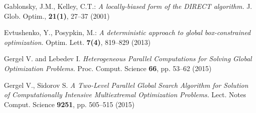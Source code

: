 \documentclass[runningheads]{llncs}
\begin{document}
\begin{thebibliography}{107}
Gablonsky, J.M., Kelley, C.T.: \emph{A locally-biased form of the DIRECT algorithm.} J. Glob.
Optim., \textbf{21(1)}, 27--37 (2001)

Evtushenko, Y., Posypkin, M.: \emph{A deterministic approach to global box-constrained
optimization.} Optim. Lett. \textbf{7(4)}, 819--829 (2013)

Gergel V. and Lebedev I. \emph{Heterogeneous Parallel Computations for Solving Global Optimization Problems.} Proc. Comput. Science \textbf{66}, pp. 53--62 (2015)

Gergel V., Sidorov S. \emph{A Two-Level Parallel Global Search Algorithm for Solution of Computationally Intensive Multiextremal Optimization Problems.} {Lect. Notes Comput. Science} \textbf{9251}, pp. 505--515 (2015)

\end{thebibliography}
\end{document}
